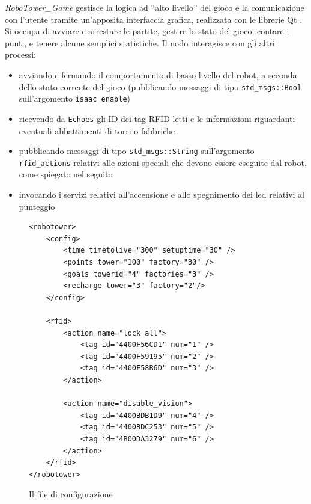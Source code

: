\emph{RoboTower\_Game} gestisce la logica ad ``alto livello'' del gioco e la comunicazione con l'utente tramite un'apposita interfaccia grafica, realizzata con le librerie Qt \cite{qtweb}. Si occupa di avviare e arrestare le partite, gestire lo stato del gioco, contare i punti, e tenere alcune semplici statistiche. Il nodo interagisce con gli altri processi:
\begin{itemize}
\item avviando e fermando il comportamento di basso livello del robot, a seconda dello stato corrente del gioco (pubblicando messaggi di tipo \verb|std_msgs::Bool| sull'argomento \verb|isaac_enable|)
\item ricevendo da \verb|Echoes| gli ID dei tag RFID letti e le informazioni riguardanti eventuali abbattimenti di torri o fabbriche
\item pubblicando messaggi di tipo \verb|std_msgs::String| sull'argomento \verb|rfid_actions| relativi alle azioni speciali che devono essere eseguite dal robot, come spiegato nel seguito
\item invocando i servizi relativi all'accensione e allo spegnimento dei led relativi al punteggio
\end{itemize}

\begin{figure}[h]
{
\begin{lstlisting}
<robotower>
	<config>
		<time timetolive="300" setuptime="30" />
		<points tower="100" factory="30" />
		<goals towerid="4" factories="3" />
		<recharge tower="3" factory="2"/>
	</config>

	<rfid>
		<action name="lock_all">
			<tag id="4400F56CD1" num="1" />
			<tag id="4400F59195" num="2" />
			<tag id="4400F58B6D" num="3" />
		</action>
      
		<action name="disable_vision">
			<tag id="4400BDB1D9" num="4" />
			<tag id="4400BDC253" num="5" />
			<tag id="4B00DA3279" num="6" />
		</action>
	</rfid>
</robotower>
\end{lstlisting}
}
\caption{Il file di configurazione}
\label{fig:configfile}
\end{figure}

